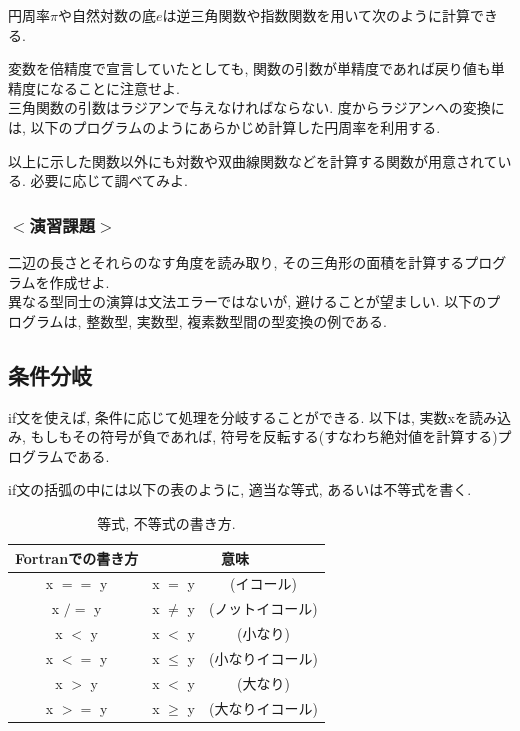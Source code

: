 \documentclass[a4j]{jsarticle}
\begin{document}
円周率$\pi$や自然対数の底$e$は逆三角関数や指数関数を用いて次のように計算できる. 

変数を倍精度で宣言していたとしても, 関数の引数が単精度であれば戻り値も単精度になることに注意せよ. \\


三角関数の引数はラジアンで与えなければならない. 
度からラジアンへの変換には, 以下のプログラムのようにあらかじめ計算した円周率を利用する. 

以上に示した関数以外にも対数や双曲線関数などを計算する関数が用意されている. 
必要に応じて調べてみよ. 

\subsubsection*{$<$演習課題$>$}
二辺の長さとそれらのなす角度を読み取り, その三角形の面積を計算するプログラムを作成せよ. \\

異なる型同士の演算は文法エラーではないが, 
避けることが望ましい. 
以下のプログラムは, 整数型, 実数型, 複素数型間の型変換の例である. 



\subsection{条件分岐}
if文を使えば, 条件に応じて処理を分岐することができる. 
以下は, 実数xを読み込み, もしもその符号が負であれば, 
符号を反転する(すなわち絶対値を計算する)プログラムである. 

if文の括弧の中には以下の表のように, 適当な等式, あるいは不等式を書く. 

\begin{table}[h]
  \caption{等式, 不等式の書き方. }
  \begin{center}
    \begin{tabular}{ccc}
      \hline
      Fortranでの書き方   & \multicolumn{2}{c}{意味} \\ \hline
      x $==$ y   & x $=$ y &(イコール)\\
      x $/=$ y   & x $\ne$ y &(ノットイコール)\\
      x $<$ y   & x $<$ y &(小なり)\\
      x $<=$ y  & x $\le$ y &(小なりイコール)\\
      x $>$ y  & x $<$ y &(大なり)\\
      x $>=$ y   & x $\ge$ y &(大なりイコール)\\ \hline
    \end{tabular}
  \end{center}
\end{table}
\end{document}
